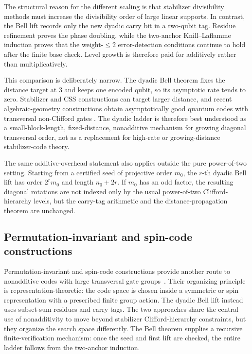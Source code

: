 \documentclass[11pt]{article}
\begin{document}
The structural reason for the different scaling is that stabilizer divisibility methods must
increase the divisibility order of large linear supports.  In contrast, the Bell lift records only
the new dyadic carry bit in a two-qubit tag.  Residue refinement proves the phase doubling, while
the two-anchor Knill--Laflamme induction proves that the weight-$\le2$ error-detection conditions
continue to hold after the finite base check.  Level growth is therefore paid for additively rather
than multiplicatively.

This comparison is deliberately narrow.  The dyadic Bell theorem fixes the distance target at
$3$ and keeps one encoded qubit, so its asymptotic rate tends to zero.  Stabilizer and CSS
constructions can target larger distance, and recent algebraic-geometry constructions obtain
asymptotically good quantum codes with transversal non-Clifford gates
\cite{GolowichGuruswami2024,Nguyen2024}.  The dyadic ladder is therefore best understood as a
small-block-length, fixed-distance, nonadditive mechanism for growing diagonal transversal order,
not as a replacement for high-rate or growing-distance stabilizer-code theory.

The same additive-overhead statement also applies outside the pure power-of-two setting.  Starting
from a certified seed of projective order $m_0$, the $r$-th dyadic Bell lift has order $2^r m_0$
and length $n_0+2r$.  If $m_0$ has an odd factor, the resulting diagonal rotations are not indexed
only by the usual power-of-two Clifford-hierarchy levels, but the carry-tag arithmetic and the
distance-propagation theorem are unchanged.

\subsection{Permutation-invariant and spin-code constructions}

Permutation-invariant and spin-code constructions provide another route to nonadditive codes with
large transversal gate groups~\cite{KubischtaTeixeira2023Exotic,KubischtaTeixeira2024PI}.  Their organizing principle is representation-theoretic: the code
space is chosen inside a symmetric or spin representation with a prescribed finite group action.
The dyadic Bell lift instead uses subset-sum residues and carry tags.  The two approaches share the
central use of nonadditivity to move beyond stabilizer Clifford-hierarchy constraints, but they
organize the search space differently.  The Bell theorem supplies a recursive finite-verification
mechanism: once the seed and first lift are checked, the entire ladder follows from the two-anchor
induction.
\end{document}
